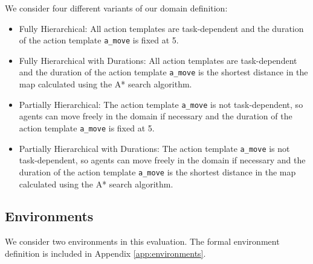 We consider four different variants of our domain definition:
\begin{itemize}
  \item Fully Hierarchical: All action templates are task-dependent and the duration of the action template \verb|a_move| is fixed at 5.
  \item Fully Hierarchical with Durations: All action templates are task-dependent and the duration of the action template \verb|a_move| is the shortest distance in the map calculated using the A* search algorithm. 
  \item Partially Hierarchical: The action template \verb|a_move| is not task-dependent, so agents can move freely in the domain if necessary and the duration of the action template \verb|a_move| is fixed at 5.
  \item Partially Hierarchical with Durations: The action template \verb|a_move| is not task-dependent, so agents can move freely in the domain if necessary and the duration of the action template \verb|a_move| is the shortest distance in the map calculated using the A* search algorithm. 
\end{itemize}






\subsection{Environments}

We consider two environments in this evaluation.
The formal environment definition is included in Appendix \ref{app:environments}.



